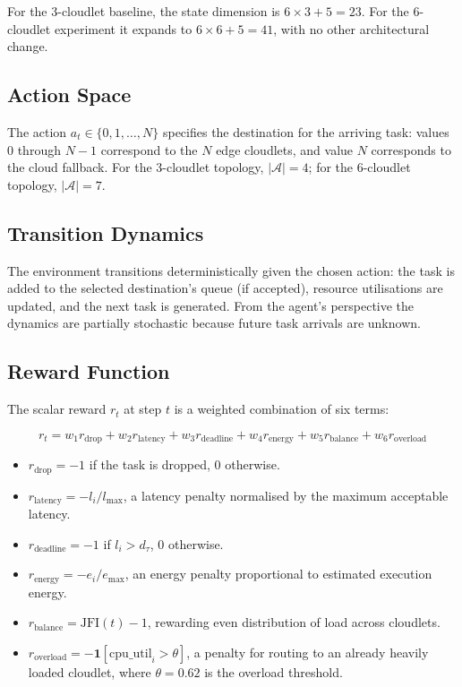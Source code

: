 For the 3-cloudlet baseline, the state dimension is
$6 \times 3 + 5 = 23$. For the 6-cloudlet experiment it expands
to $6 \times 6 + 5 = 41$, with no other architectural change.

\subsection{Action Space}

The action $a_t \in \{0, 1, \ldots, N\}$ specifies the
destination for the arriving task: values $0$ through $N{-}1$
correspond to the $N$ edge cloudlets, and value $N$ corresponds
to the cloud fallback. For the 3-cloudlet topology,
$|\mathcal{A}| = 4$; for the 6-cloudlet topology,
$|\mathcal{A}| = 7$.

\subsection{Transition Dynamics}

The environment transitions deterministically given the chosen
action: the task is added to the selected destination's queue (if
accepted), resource utilisations are updated, and the next task
is generated. From the agent's perspective the dynamics are
partially stochastic because future task arrivals are unknown.

\subsection{Reward Function}

The scalar reward $r_t$ at step $t$ is a weighted combination
of six terms:

\begin{equation}
r_t = w_1 r_{\text{drop}} + w_2 r_{\text{latency}}
    + w_3 r_{\text{deadline}} + w_4 r_{\text{energy}}
    + w_5 r_{\text{balance}} + w_6 r_{\text{overload}}
\label{eq:reward}
\end{equation}

\begin{itemize}
  \item $r_{\text{drop}} = -1$ if the task is dropped, $0$
  otherwise.
  \item $r_{\text{latency}} = -l_i / l_{\max}$, a latency
  penalty normalised by the maximum acceptable latency.
  \item $r_{\text{deadline}} = -1$ if $l_i > d_\tau$, $0$
  otherwise.
  \item $r_{\text{energy}} = -e_i / e_{\max}$, an energy penalty
  proportional to estimated execution energy.
  \item $r_{\text{balance}} = \text{JFI}(t) - 1$, rewarding even
  distribution of load across cloudlets.
  \item $r_{\text{overload}} = -\mathbf{1}[\text{cpu\_util}_i > \theta]$,
  a penalty for routing to an already heavily loaded cloudlet,
  where $\theta = 0.62$ is the overload threshold.
\end{itemize}

